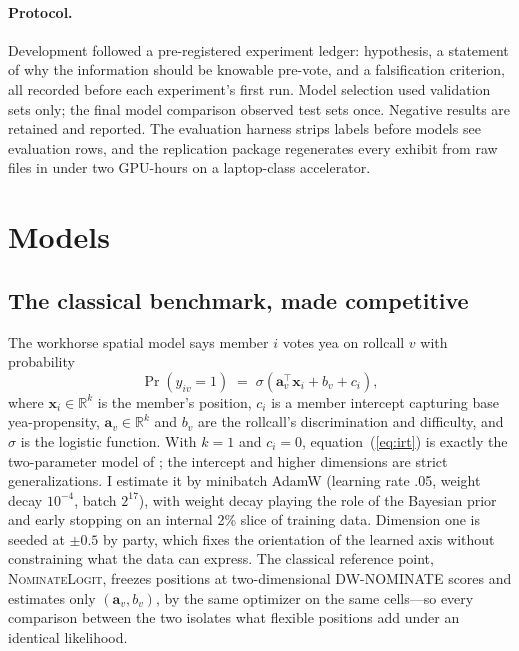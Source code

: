\documentclass[12pt]{article}
\begin{document}
\paragraph{Protocol.} Development followed a pre-registered experiment
ledger: hypothesis, a statement of why the information should be
knowable pre-vote, and a falsification criterion, all recorded before
each experiment's first run. Model selection used validation sets only;
the final model comparison observed test sets once. Negative results
are retained and reported. The evaluation harness strips labels before
models see evaluation rows, and the replication package regenerates
every exhibit from raw files in under two GPU-hours on a laptop-class
accelerator.

\section{Models}
\label{sec:models}

\subsection{The classical benchmark, made competitive}
\label{sec:spatial}

The workhorse spatial model says member $i$ votes yea on rollcall $v$
with probability
\begin{equation}
\Pr(y_{iv}=1) \;=\; \sigma\!\left(\mathbf{a}_v^\top \mathbf{x}_i + b_v
+ c_i\right),
\label{eq:irt}
\end{equation}
where $\mathbf{x}_i \in \mathbb{R}^k$ is the member's position, $c_i$
is a member intercept capturing base yea-propensity,
$\mathbf{a}_v \in \mathbb{R}^k$ and $b_v$ are the rollcall's
discrimination and difficulty, and $\sigma$ is the logistic function.
With $k=1$ and $c_i = 0$, equation~(\ref{eq:irt}) is exactly the
two-parameter model of \citet{clinton2004statistical}; the intercept
and higher dimensions are strict generalizations. I estimate it by
minibatch AdamW (learning rate .05, weight decay $10^{-4}$, batch
$2^{17}$), with weight decay playing the role of the Bayesian prior and
early stopping on an internal 2\% slice of training data. Dimension one
is seeded at $\pm 0.5$ by party, which fixes the orientation of the
learned axis without constraining what the data can express. The
classical reference point, \textsc{NominateLogit}, freezes positions at
two-dimensional DW-NOMINATE scores and estimates only
$(\mathbf{a}_v, b_v)$, by the same optimizer on the same cells---so
every comparison between the two isolates what flexible positions add
under an identical likelihood.
\end{document}
